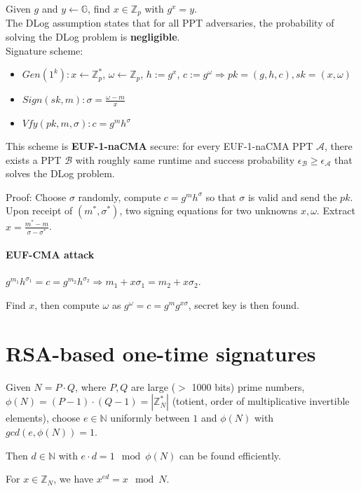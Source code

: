 \documentclass[oneside]{book}
\newcommand{\N}[0]{\mathbb{N}}
\newcommand{\Z}[0]{\mathbb{Z}}
\newcommand{\G}[0]{\mathbb{G}}
\newcommand{\cA}[0]{\mathcal{A}}
\newcommand{\cB}[0]{\mathcal{B}}
\begin{document}
Given $g$ and $y \leftarrow \G$, find $x \in \Z_p$ with $g^x = y$.\\

The DLog assumption states that for all PPT adversaries, the probability of solving the DLog problem is \textbf{negligible}.\\

Signature scheme:
\begin{itemize}
    \item $Gen(1^k): x \leftarrow \Z^*_p$, $\omega \leftarrow \Z_p$, $h := g^x$, $c := g^\omega \Rightarrow pk = (g, h, c), sk = (x, \omega)$
    \item $Sign(sk, m): \sigma = \frac{\omega - m}{x}$
    \item $Vfy(pk, m, \sigma): c = g^mh^\sigma$
\end{itemize}

This scheme is \textbf{EUF-1-naCMA} secure: for every EUF-1-naCMA PPT $\cA$, there exists a PPT $\cB$ with roughly same runtime and success probability $\epsilon_\cB \ge \epsilon_\cA$ that solves the DLog problem.

Proof: Choose $\sigma$ randomly, compute $c = g^mh^\sigma$ so that $\sigma$ is valid and send the $pk$.
Upon receipt of $(m^*, \sigma^*)$, two signing equations for two unknowns $x, \omega$. Extract $x = \frac{m^*-m}{\sigma-\sigma^*}$.

\paragraph{EUF-CMA attack} $g^{m_1}h^{\sigma_1} = c = g^{m_2}h^{\sigma_2} \Rightarrow m_1+x\sigma_1 = m_2+x\sigma_2$.

Find $x$, then compute $\omega$ as $g^\omega = c = g^mg^{x\sigma}$, secret key is then found.

\section{RSA-based one-time signatures}
Given $N = P \cdot Q$, where $P, Q$ are large ($>$ 1000 bits) prime numbers, $\phi(N) = (P-1) \cdot (Q-1) = |\Z^*_N|$ (totient, order of multiplicative invertible elements), choose $e \in \N$ uniformly between $1$ and $\phi(N)$ with $gcd(e, \phi(N)) = 1$.

Then $d \in \N$ with $e \cdot d = 1 \mod \phi(N)$ can be found efficiently.

For $x \in \Z_N$, we have $x^{ed} = x \mod N$.\\
\end{document}
